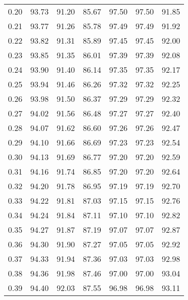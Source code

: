 \begin{tabular}{|c|c|c|c|c|c|c|}
      0.20 &     93.73 &     91.20 &      85.67 &   97.50 &      97.50 &         91.85 \\
      0.21 &     93.77 &     91.26 &      85.78 &   97.49 &      97.49 &         91.92 \\
      0.22 &     93.82 &     91.31 &      85.89 &   97.45 &      97.45 &         92.00 \\
      0.23 &     93.85 &     91.35 &      86.01 &   97.39 &      97.39 &         92.08 \\
      0.24 &     93.90 &     91.40 &      86.14 &   97.35 &      97.35 &         92.17 \\
      0.25 &     93.94 &     91.46 &      86.26 &   97.32 &      97.32 &         92.25 \\
      0.26 &     93.98 &     91.50 &      86.37 &   97.29 &      97.29 &         92.32 \\
      0.27 &     94.02 &     91.56 &      86.48 &   97.27 &      97.27 &         92.40 \\
      0.28 &     94.07 &     91.62 &      86.60 &   97.26 &      97.26 &         92.47 \\
      0.29 &     94.10 &     91.66 &      86.69 &   97.23 &      97.23 &         92.54 \\
      0.30 &     94.13 &     91.69 &      86.77 &   97.20 &      97.20 &         92.59 \\
      0.31 &     94.16 &     91.74 &      86.85 &   97.20 &      97.20 &         92.64 \\
      0.32 &     94.20 &     91.78 &      86.95 &   97.19 &      97.19 &         92.70 \\
      0.33 &     94.22 &     91.81 &      87.03 &   97.15 &      97.15 &         92.76 \\
      0.34 &     94.24 &     91.84 &      87.11 &   97.10 &      97.10 &         92.82 \\
      0.35 &     94.27 &     91.87 &      87.19 &   97.07 &      97.07 &         92.87 \\
      0.36 &     94.30 &     91.90 &      87.27 &   97.05 &      97.05 &         92.92 \\
      0.37 &     94.33 &     91.94 &      87.36 &   97.03 &      97.03 &         92.98 \\
      0.38 &     94.36 &     91.98 &      87.46 &   97.00 &      97.00 &         93.04 \\
      0.39 &     94.40 &     92.03 &      87.55 &   96.98 &      96.98 &         93.11 \\

\end{tabular}
